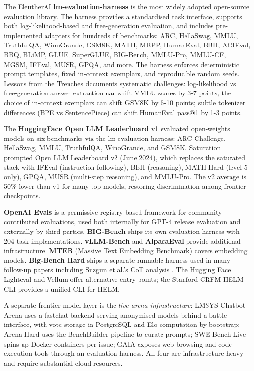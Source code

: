 \documentclass{article}
\begin{document}
The EleutherAI \textbf{lm-evaluation-harness} \cite{biderman20242024} is the most widely adopted open-source evaluation library. The harness provides a standardised task interface, supports both log-likelihood-based and free-generation evaluation, and includes pre-implemented adapters for hundreds of benchmarks: ARC, HellaSwag, MMLU, TruthfulQA, WinoGrande, GSM8K, MATH, MBPP, HumanEval, BBH, AGIEval, BBQ, BLiMP, GLUE, SuperGLUE, BIG-Bench, MMLU-Pro, MMLU-CF, MGSM, IFEval, MUSR, GPQA, and more. The harness enforces deterministic prompt templates, fixed in-context exemplars, and reproducible random seeds. Lessons from the Trenches \cite{biderman20242024} documents systematic challenges: log-likelihood vs free-generation answer extraction can shift MMLU scores by 3-7 points; the choice of in-context exemplars can shift GSM8K by 5-10 points; subtle tokenizer differences (BPE vs SentencePiece) can shift HumanEval pass@1 by 1-3 points.

The \textbf{HuggingFace Open LLM Leaderboard} v1 evaluated open-weights models on six benchmarks via the lm-evaluation-harness: ARC-Challenge, HellaSwag, MMLU, TruthfulQA, WinoGrande, and GSM8K. Saturation prompted Open LLM Leaderboard v2 (June 2024), which replaces the saturated stack with IFEval (instruction-following), BBH (reasoning), MATH-Hard (level 5 only), GPQA, MUSR (multi-step reasoning), and MMLU-Pro. The v2 average is 50\% lower than v1 for many top models, restoring discrimination among frontier checkpoints.

\textbf{OpenAI Evals} is a permissive registry-based framework for community-contributed evaluations, used both internally for GPT-4 release evaluation and externally by third parties. \textbf{BIG-Bench} ships its own evaluation harness with 204 task implementations. \textbf{vLLM-Bench} and \textbf{AlpacaEval} provide additional infrastructure. \textbf{MTEB} (Massive Text Embedding Benchmark) covers embedding models. \textbf{Big-Bench Hard} ships a separate runnable harness used in many follow-up papers including Suzgun et al.'s CoT analysis \cite{suzgun2022challengingbigbenc}. The Hugging Face Lighteval and Vellum offer alternative entry points; the Stanford CRFM HELM CLI provides a unified CLI for HELM.

A separate frontier-model layer is the \emph{live arena infrastructure}: LMSYS Chatbot Arena \cite{chiang20242024} uses a fastchat backend serving anonymised models behind a battle interface, with vote storage in PostgreSQL and Elo computation by bootstrap; Arena-Hard \cite{li20242024} uses the BenchBuilder pipeline to curate prompts; SWE-Bench-Live spins up Docker containers per-issue; GAIA exposes web-browsing and code-execution tools through an evaluation harness. All four are infrastructure-heavy and require substantial cloud resources.
\end{document}
